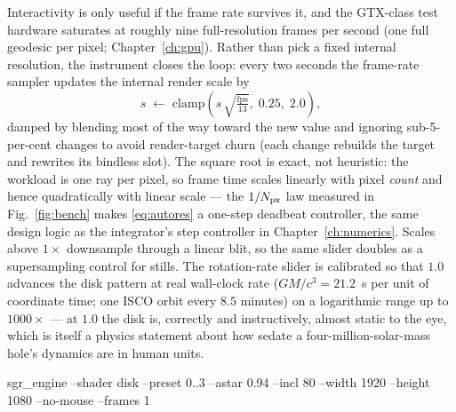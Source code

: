 Interactivity is only useful if the frame rate survives it, and the
GTX-class test hardware saturates at roughly nine full-resolution
frames per second (one full geodesic per pixel;
Chapter~\ref{ch:gpu}). Rather than pick a fixed internal resolution,
the instrument closes the loop: every two seconds the frame-rate
sampler updates the internal render scale by
\begin{equation}
s \;\leftarrow\; \mathrm{clamp}\!\left(s\,
\sqrt{\tfrac{\mathrm{fps}}{13}},\; 0.25,\; 2.0\right),
\label{eq:autores}
\end{equation}
damped by blending most of the way toward the new value and ignoring
sub-5-per-cent changes to avoid render-target churn (each change
rebuilds the target and rewrites its bindless slot). The square root
is exact, not heuristic: the workload is one ray per pixel, so frame
time scales linearly with pixel \emph{count} and hence quadratically
with linear scale — the $1/N_{\rm px}$ law measured in
Fig.~\ref{fig:bench} makes \eqref{eq:autores} a one-step deadbeat
controller, the same design logic as the integrator's step
controller in Chapter~\ref{ch:numerics}. Scales above $1\times$
downsample through a linear blit, so the same slider doubles as a
supersampling control for stills. The rotation-rate slider is
calibrated so that $1.0$ advances the disk pattern at real \sgra{}
wall-clock rate ($GM/c^3 = 21.2$~s per unit of coordinate time; one
ISCO orbit every $8.5$ minutes) on a logarithmic range up to
$1000\times$ — at $1.0$ the disk is, correctly and instructively,
almost static to the eye, which is itself a physics statement about
how sedate a four-million-solar-mass hole's dynamics are in human
units.

%
{sgr\_engine --shader disk --preset 0..3 --astar 0.94 --incl 80
--width 1920 --height 1080 --no-mouse --frames 1}

